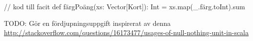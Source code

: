 \begin{Code}
// kod till facit
def färgPoäng(xs: Vector[Kort]): Int = xs.map(_.färg.toInt).sum
\end{Code}





\ExtraTasks %

\Task 

\AdvancedTasks %

\Task TODO: Gör en fördjupningsuppgift inspirerat av denna \url{http://stackoverflow.com/questions/16173477/usages-of-null-nothing-unit-in-scala}    
    